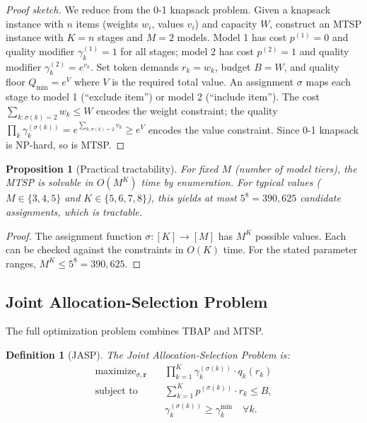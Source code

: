\documentclass[11pt, a4paper, logo, copyright]{googledeepmind}
\DeclareMathOperator*{\maximize}{maximize}
\newtheorem{definition}{Definition}[section]
\newtheorem{proposition}{Proposition}[section]
\begin{document}
\begin{proof}[Proof sketch]
We reduce from the 0-1 knapsack problem. Given a knapsack instance with $n$ items (weights $w_i$, values $v_i$) and capacity $W$, construct an MTSP instance with $K = n$ stages and $M = 2$ models. Model 1 has cost $p^{(1)} = 0$ and quality modifier $\gamma_k^{(1)} = 1$ for all stages; model 2 has cost $p^{(2)} = 1$ and quality modifier $\gamma_k^{(2)} = e^{v_k}$. Set token demands $r_k = w_k$, budget $B = W$, and quality floor $Q_{\min} = e^{V}$ where $V$ is the required total value. An assignment $\sigma$ maps each stage to model 1 (``exclude item'') or model 2 (``include item''). The cost $\sum_{k: \sigma(k)=2} w_k \leq W$ encodes the weight constraint; the quality $\prod_k \gamma_k^{(\sigma(k))} = e^{\sum_{k: \sigma(k)=2} v_k} \geq e^V$ encodes the value constraint. Since 0-1 knapsack is NP-hard, so is MTSP.
\end{proof}

\begin{proposition}[Practical tractability]\label{prop:tractable}
For fixed $M$ (number of model tiers), the MTSP is solvable in $O(M^K)$ time by enumeration. For typical values ($M \in \{3, 4, 5\}$ and $K \in \{5, 6, 7, 8\}$), this yields at most $5^8 = 390{,}625$ candidate assignments, which is tractable.
\end{proposition}

\begin{proof}
The assignment function $\sigma: [K] \to [M]$ has $M^K$ possible values. Each can be checked against the constraints in $O(K)$ time. For the stated parameter ranges, $M^K \leq 5^8 = 390{,}625$.
\end{proof}

\subsection{Joint Allocation-Selection Problem}

The full optimization problem combines TBAP and MTSP.

\begin{definition}[JASP]\label{def:jasp}
The \emph{Joint Allocation-Selection Problem} is:
\begin{equation}\label{eq:jasp}
\begin{aligned}
    \maximize_{\sigma, \mathbf{r}} \quad & \prod_{k=1}^{K} \gamma_k^{(\sigma(k))} \cdot q_k(r_k) \\
    \text{subject to} \quad & \sum_{k=1}^{K} p^{(\sigma(k))} \cdot r_k \leq B, \\
    & \gamma_k^{(\sigma(k))} \geq \gamma_k^{\min} \quad \forall k.
\end{aligned}
\end{equation}
\end{definition}
\end{document}
